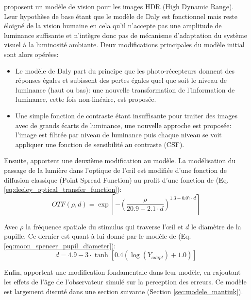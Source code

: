 	\par \citep{mantiuk_visible_2004} proposent un modèle de vision pour les images HDR (High Dynamic Range). Leur hypothèse de base étant que le modèle de Daly est fonctionnel mais reste éloigné de la vision humaine en cela qu'il n'accepte pas une amplitude de luminance suffisante et n'intègre donc pas de mécanisme d'adaptation du système visuel à la luminosité ambiante. Deux modifications principales du modèle initial sont alors opérées:
	\begin{itemize}
	\item Le modèle de Daly part du principe que les photo-récepteurs donnent des réponses égales et subissent des pertes égales quel que soit le niveau de luminance (haut ou bas): une nouvelle transformation de l'information de luminance, cette fois non-linéaire, est proposée.
	\item Une simple fonction de contraste étant insuffisante pour traiter des images avec de grands écarts de luminance, une nouvelle approche est proposée: l'image est filtrée par niveau de luminance puis chaque niveau se voit appliquer une fonction de sensibilité au contraste (CSF).
	\end{itemize}
	
	\par Ensuite, \citep{mantiuk_predicting_2005} apportent une deuxième modification au modèle. La modélisation du passage de la lumière dans l'optique de l'œil est modifiée d'une fonction de diffusion classique (Point Spread Function) au profit d'une fonction de \citep{deeley_simple_1991} (Eq. \ref{eq:deeley_optical_transfer_function}):
	\begin{equation}
	OTF(\rho,d) = \exp \left[ - \left( \frac{\rho}{20.9 - 2.1 \cdot d} \right)^{1.3 - 0.07 \cdot d} \right]
	\label{eq:deeley_optical_transfer_function}
	\end{equation}
	
	\par Avec $\rho$ la fréquence spatiale du stimulus qui traverse l'œil et $d$ le diamètre de la pupille. Ce dernier est quant à lui donné par le modèle de \citep{moon_visual_1944} (Eq. \ref{eq:moon_spencer_pupil_diameter}):
	\begin{equation}
	d = 4.9 - 3 \cdot \tanh \left[ 0.4 \left( \log(Y_{adapt}) + 1.0 \right) \right]
	\label{eq:moon_spencer_pupil_diameter}
	\end{equation}
	
	\par Enfin, \citep{mantiuk_human_2015} apportent une modification fondamentale dans leur modèle, en rajoutant les effets de l'âge de l'observateur simulé sur la perception des erreurs. Ce modèle est largement discuté dans une section suivante (Section \ref{sec:modele_mantiuk}).
	
